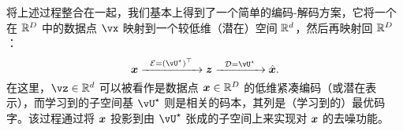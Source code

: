 \documentclass[../../book-main_zh.tex]{subfiles}
\begin{document}
将上述过程整合在一起，我们基本上得到了一个简单的编码-解码方案，它将一个在 $\mathbb{R}^D$ 中的数据点 $\vx$ 映射到一个较低维（潜在）空间 $\mathbb{R}^d$，然后再映射回 $\mathbb{R}^D$：
\begin{equation}
\x \xrightarrow{\hspace{2mm} \mathcal{E} = (\vU^\star)^\top \hspace{2mm}}  \z
    \xrightarrow{\hspace{2mm} \mathcal{D} = \vU^\star \hspace{2mm}}   \hat{\x}.  
\label{eqn:autoencoding-PCA}
\end{equation}
在这里，$\vz \in \R^d$ 可以被看作是数据点 $\bm{x} \in \mathbb{R}^D$ 的低维紧凑编码（或潜在表示），而学习到的子空间基 $\vU^\star$ 则是相关的码本，其列是（学习到的）最优码字。该过程通过将 $\bm{x}$ 投影到由 $\vU^\star$ 张成的子空间上来实现对 $\bm{x}$ 的去噪功能。
\end{document}
